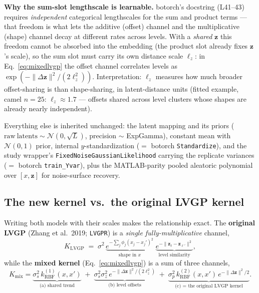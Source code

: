 \documentclass[11pt]{article}
\begin{document}
\textbf{Why the sum-slot lengthscale is learnable.} botorch's docstring (L41--43) requires
\emph{independent} categorical lengthscales for the sum and product terms --- that freedom is
what lets the additive (offset) channel and the multiplicative (shape) channel decay at
different rates across levels. With a \emph{shared} $\mathbf z$ this freedom cannot be
absorbed into the embedding (the product slot already fixes $\mathbf z$'s scale), so the sum
slot must carry its own distance scale $\ell_z$: in Eq.~\ref{eq:mixedlvgp} the offset channel
correlates levels as $\exp(-\|\Delta\mathbf z\|^2/(2\ell_z^2))$. Interpretation: $\ell_z$
measures how much broader offset-sharing is than shape-sharing, in latent-distance units
(fitted example, camel $n{=}25$: $\ell_z \approx 1.7$ --- offsets shared across level
clusters whose shapes are already nearly independent).

Everything else is inherited unchanged: the latent mapping and its priors
($\mathrm{raw\ latents} \sim \mathcal N(0,\sqrt{L})$, precision $\sim$ ExpGamma), constant
mean with $\mathcal N(0,1)$ prior, internal $y$-standardization ($=$ botorch
\texttt{Standardize}), and the study wrapper's \texttt{FixedNoiseGaussianLikelihood} carrying
the replicate variances ($=$ botorch \texttt{train\_Yvar}), plus the MATLAB-parity pooled
aleatoric polynomial over $[x, \mathbf z]$ for noise-surface recovery.

\subsection*{The new kernel vs.\ the original LVGP kernel}

Writing both models with their scales makes the relationship exact. The \textbf{original
LVGP} (Zhang et al.\ 2019; \texttt{LVGPR}) is a \emph{single fully-multiplicative} channel,
\begin{equation}
K_{\mathrm{LVGP}} \;=\; \sigma^2\,
\underbrace{e^{-\sum_j \phi_j (x_j-x_j')^2}}_{\text{shape in } x}\;
\underbrace{e^{-\|\mathbf z_\ell - \mathbf z_{\ell'}\|^2}}_{\text{level similarity}},
\label{eq:lvgporig}
\end{equation}
while the \textbf{mixed kernel} (Eq.~\ref{eq:mixedlvgp}) is a sum of three channels,
$$
K_{\mathrm{mix}} = \underbrace{\sigma_s^2\, k^{(1)}_{\mathrm{RBF}}(x,x')}_{\text{(a) shared
trend}} \;+\; \underbrace{\sigma_s^2\sigma_z^2\,
e^{-\|\Delta\mathbf z\|^2/(2\ell_z^2)}}_{\text{(b) level offsets}} \;+\;
\underbrace{\sigma_p^2\, k^{(2)}_{\mathrm{RBF}}(x,x')\,
e^{-\|\Delta\mathbf z\|^2/2}}_{\text{(c) = the original LVGP kernel}}.
$$
\end{document}
